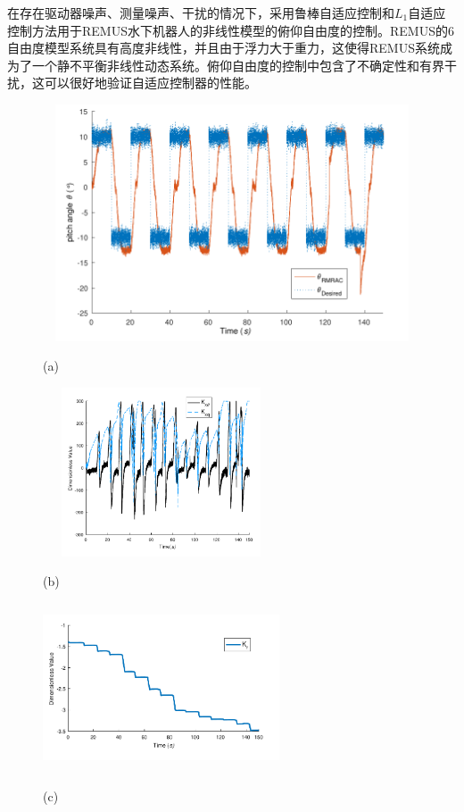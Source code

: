 在存在驱动器噪声、测量噪声、干扰的情况下，采用鲁棒自适应控制和$L_1$自适应控制方法用于REMUS水下机器人的非线性模型的俯仰自由度的控制。REMUS的6自由度模型系统具有高度非线性，并且由于浮力大于重力，这使得REMUS系统成为了一个静不平衡非线性动态系统。俯仰自由度的控制中包含了不确定性和有界干扰，这可以很好地验证自适应控制器的性能。

\begin{figure}[!htp]
\centering
\begin{minipage}{0.9\linewidth}
  \centerline{\includegraphics[width=12.0cm,height = 7cm]{figure/chap5/6dof/RMRAC/RMRA_x_pulse.pdf}}
  \centerline{(a) }
\end{minipage}
\vfill
\begin{minipage}{0.48\linewidth}
  \centerline{\includegraphics[width=7.0cm,height = 5cm]{figure/chap5/6dof/RMRAC/K_x.pdf}}
  \centerline{(b) }
\end{minipage}
\hfill
\begin{minipage}{0.48\linewidth}
  \centerline{\includegraphics[width=7.0cm,height = 5cm]{figure/chap5/6dof/RMRAC/K_r.pdf}}
  \centerline{(c) }
\end{minipage}
\label{fig:chap5:F5}
\end{figure}

